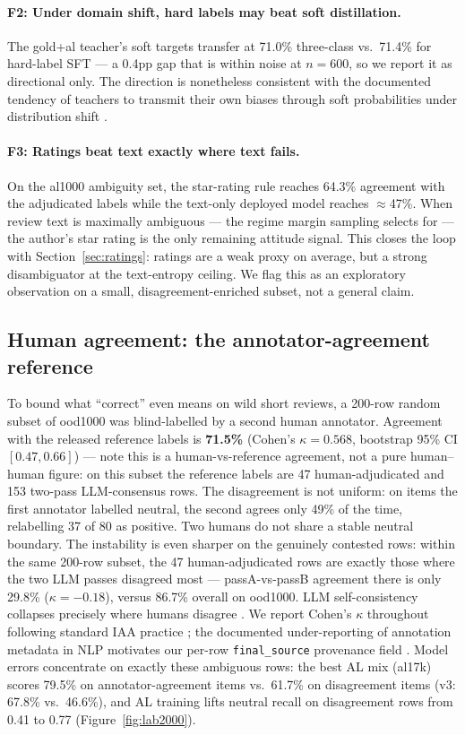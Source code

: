 \documentclass[11pt,a4paper]{article}
\newcommand{\code}[1]{\texttt{#1}}
\begin{document}
\paragraph{F2: Under domain shift, hard labels may beat soft
distillation.} The gold+al teacher's soft targets transfer at 71.0\%
three-class vs.\ 71.4\% for hard-label SFT --- a 0.4pp gap that is
within noise at $n{=}600$, so we report it as directional only. The
direction is nonetheless consistent with the documented tendency of
teachers to transmit their own biases through soft probabilities under
distribution shift \citep{zhang2023shiftkd}.

\paragraph{F3: Ratings beat text exactly where text fails.} On the
al1000 ambiguity set, the star-rating rule reaches 64.3\% agreement
with the adjudicated labels while the text-only deployed model reaches
$\approx$47\%. When review text is maximally ambiguous --- the regime
margin sampling selects for --- the author's star rating is the only
remaining attitude signal. This closes the loop with
Section~\ref{sec:ratings}: ratings are a weak proxy on average, but a
strong disambiguator at the text-entropy ceiling. We flag this as an
exploratory observation on a small, disagreement-enriched subset, not
a general claim.

\subsection{Human agreement: the annotator-agreement reference}
\label{sec:iaa}

To bound what ``correct'' even means on wild short reviews, a 200-row
random subset of ood1000 was blind-labelled by a second human
annotator. Agreement with the released reference labels is
\textbf{71.5\%} (Cohen's $\kappa = 0.568$, bootstrap 95\% CI
$[0.47, 0.66]$) --- note this is a human-vs-reference agreement, not a
pure human--human figure: on this subset the reference labels are 47
human-adjudicated and 153 two-pass LLM-consensus rows. The
disagreement is not uniform: on items the first annotator labelled
neutral, the second agrees only 49\% of the time, relabelling 37 of 80
as positive. Two humans do not share a stable neutral boundary. The
instability is even sharper on the genuinely contested rows: within
the same 200-row subset, the 47 human-adjudicated rows are exactly
those where the two LLM passes disagreed most --- passA-vs-passB
agreement there is only 29.8\% ($\kappa = -0.18$), versus 86.7\%
overall on ood1000. LLM self-consistency collapses precisely where
humans disagree \citep{davani2022}. We report Cohen's $\kappa$
throughout following standard IAA practice \citep{artstein2008}; the
documented under-reporting of annotation metadata in NLP motivates
our per-row \code{final\_source} provenance field
\citep{kunilovskaya2026,alkhalifa2026}. Model errors concentrate on
exactly these ambiguous rows: the best AL
mix (al17k) scores 79.5\% on annotator-agreement items vs.\ 61.7\% on
disagreement items (v3: 67.8\% vs.\ 46.6\%), and AL training lifts
neutral recall on disagreement rows from 0.41 to 0.77
(Figure~\ref{fig:lab2000}).
\end{document}
